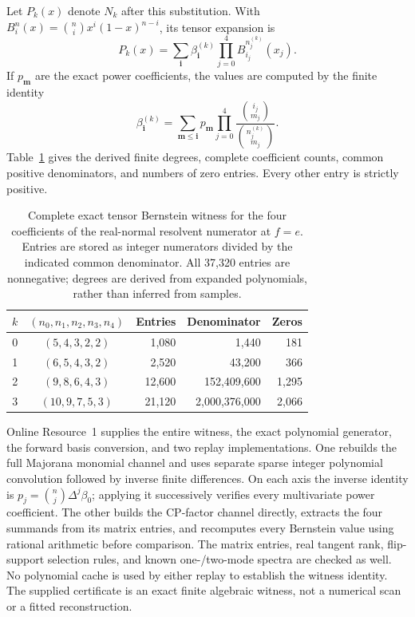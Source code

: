 \documentclass[11pt,a4paper]{article}
\begin{document}
Let $P_k(x)$ denote $N_k$ after this substitution. With
$B_i^n(x)=\binom ni x^i(1-x)^{n-i}$, its tensor expansion is
\begin{equation}
 P_k(x)=\sum_{\boldsymbol i}\beta^{(k)}_{\boldsymbol i}
                  \prod_{j=0}^4 B_{i_j}^{n_j^{(k)}}(x_j).
 \label{eq:Bernstein}
\end{equation}
If $p_{\boldsymbol m}$ are the exact power coefficients, the values
are computed by the finite identity
\begin{equation}
 \beta_{\boldsymbol i}^{(k)}
 =\sum_{\boldsymbol m\le\boldsymbol i}p_{\boldsymbol m}
    \prod_{j=0}^4\frac{\binom{i_j}{m_j}}{\binom{n_j^{(k)}}{m_j}}.
 \label{eq:basisconvert}
\end{equation}
Table~\ref{tab:certificate} gives the derived finite degrees,
complete coefficient counts, common positive denominators, and
numbers of zero entries. Every other entry is strictly positive.
\begin{table}[tb]
\centering
\caption{Complete exact tensor Bernstein witness for the four
coefficients of the real-normal resolvent numerator at $f=e$.
Entries are stored as integer numerators divided by the indicated
common denominator. All 37,320 entries are nonnegative; degrees
are derived from expanded polynomials, rather than inferred from samples.}
\label{tab:certificate}
\begin{tabular}{@{}ccrrr@{}}
\toprule
$k$ & $(n_0,n_1,n_2,n_3,n_4)$ & Entries & Denominator & Zeros\\
\midrule
0 & $(5,4,3,2,2)$    & 1,080  & 1,440         & 181\\
1 & $(6,5,4,3,2)$    & 2,520  & 43,200        & 366\\
2 & $(9,8,6,4,3)$    & 12,600 & 152,409,600   & 1,295\\
3 & $(10,9,7,5,3)$   & 21,120 & 2,000,376,000 & 2,066\\
\bottomrule
\end{tabular}
\end{table}

Online Resource~1 supplies the entire witness, the exact polynomial
generator, the forward basis conversion, and two replay implementations.
One rebuilds the full Majorana monomial channel and uses separate
sparse integer polynomial convolution followed by inverse finite
differences. On each axis the inverse identity is
$p_j=\binom nj\Delta^j\beta_0$; applying it successively verifies
every multivariate power coefficient. The other builds the CP-factor
channel directly, extracts the four summands from its matrix entries,
and recomputes every Bernstein value using rational arithmetic before
comparison. The matrix entries, real tangent rank, flip-support
selection rules, and known one-/two-mode spectra are checked as well.
No polynomial cache is used by either replay to establish the witness
identity. The supplied certificate is an exact finite algebraic witness,
not a numerical scan or a fitted reconstruction.
\end{document}
